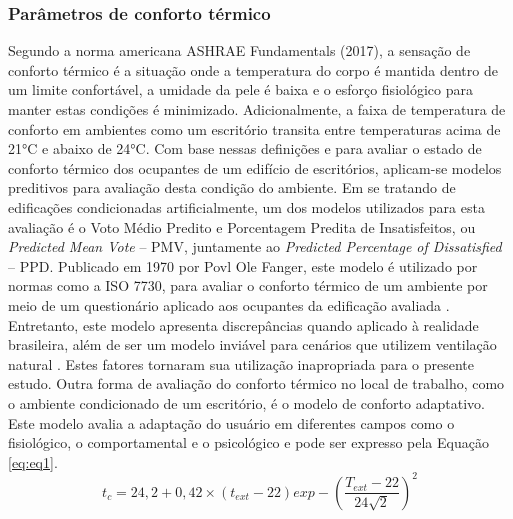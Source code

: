 \subsubsection{Parâmetros de conforto térmico}
Segundo a norma americana ASHRAE Fundamentals (2017), a sensação de conforto térmico é a situação onde a temperatura do corpo é mantida dentro de um limite confortável, a umidade da pele é baixa e o esforço fisiológico para manter estas condições é minimizado. Adicionalmente, a faixa de temperatura de conforto em ambientes como um escritório transita entre temperaturas acima de 21°C e abaixo de 24°C. Com base nessas definições e para avaliar o estado de conforto térmico dos ocupantes de um edifício de escritórios, aplicam-se modelos preditivos para avaliação desta condição do ambiente.\vspace*{0.3cm} \newline
Em se tratando de edificações condicionadas artificialmente, um dos modelos utilizados para esta avaliação é o Voto Médio Predito e Porcentagem Predita de Insatisfeitos, ou \textit{Predicted Mean Vote} – PMV, juntamente ao \textit{Predicted Percentage of Dissatisfied} – PPD.\vspace*{0.3cm} \newline
Publicado em 1970 por Povl Ole Fanger, este modelo é utilizado por normas como a ISO 7730, para avaliar o conforto térmico de um ambiente por meio de um questionário aplicado aos ocupantes da edificação avaliada \cite{AmericanSocietyofHeatingRefrigeratingandAir-ConditioningEngineers-ASHRAE2017}. Entretanto, este modelo apresenta discrepâncias quando aplicado à realidade brasileira, além de ser um modelo inviável para cenários que utilizem ventilação natural \cite{Rupp2016}. Estes fatores tornaram sua utilização inapropriada para o presente estudo. Outra forma de avaliação do conforto térmico no local de trabalho, como o ambiente condicionado de um escritório, é o modelo de conforto adaptativo. Este modelo avalia a adaptação do usuário em diferentes campos como o fisiológico, o comportamental e o psicológico \cite{AmericanSocietyofHeatingRefrigeratingandAir-ConditioningEngineers-ASHRAE2017a} e pode ser expresso pela Equação \ref{eq:eq1}.
\begin{equation}\label{eq:eq1}
            t_{c}=24,2+0,42\times(t_{ext}-22)exp-\left(\frac{T_{ext}-22}{24\sqrt{2}}\right)^2
\end{equation}

